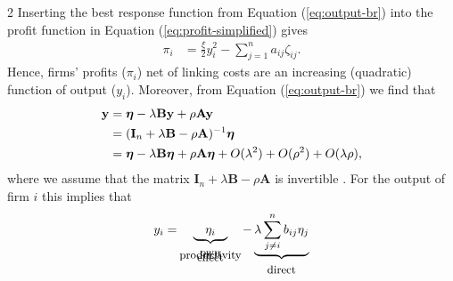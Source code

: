 \documentclass[12pt]{article}
\begin{document}
\begin{spacing}{2}
Inserting the best response function from Equation (\ref{eq:output-br}) into the profit function in Equation (\ref{eq:profit-simplified}) gives
\begin{align}
\pi_i & = 
\frac{\xi}{2} y_i^2 - \sum_{j=1}^n a_{ij} \zeta_{ij}.
\label{eq:profit-eq}
\end{align}
Hence, firms' profits ($\pi_i$) net of linking costs are an increasing (quadratic) function of output ($y_i$). Moreover, from Equation (\ref{eq:output-br}) we find that%
\begin{align}
\mathbf{y}  
 & = \bm{\eta} - \lambda \mathbf{B} \mathbf{y} + \rho \mathbf{A} \mathbf{y} \notag \\
 & = (\mathbf{I}_n + \lambda \mathbf{B} - \rho \mathbf{A})^{-1} \bm{\eta} \label{eq:bonacich} \\
 & = \bm{\eta}  - \lambda \mathbf{B} \bm{\eta}  + \rho \mathbf{A}\bm{\eta} + O(\lambda^2) + O(\rho^2) + O(\lambda \rho), \notag
\end{align}
where we assume that the matrix $\mathbf{I}_n + \lambda \mathbf{B} - \rho \mathbf{A}$ is invertible \citep[cf.][]{horn90:_matrix_analy}. For the output of firm $i$ this implies that
\begin{equation}
y_i =
\hspace{-0.2cm}
\underbrace{\phantom{qq} \eta_i \phantom{qq}}_{
\begin{array}{c}
\vspace{-0.35cm} \small \text{own} \\
\vspace{-0.35cm} \small \text{productivity} \\
\vspace{-0.35cm} \small \text{effect}
\end{array}
}  
\hspace{-0.2cm}
- 
\underbrace{\lambda \sum_{j \ne i}^n b_{ij} \eta_j}_{
\begin{array}{c}
\vspace{-0.35cm} \small \text{direct} \\

\end{array}}
\end{equation}
\end{spacing}
\end{document}
